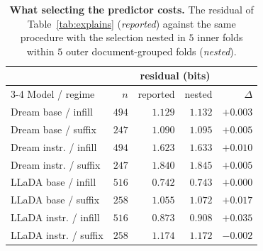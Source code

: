 \begin{table}[!ht]
\centering
\footnotesize
\setlength{\tabcolsep}{5pt}
\begin{tabular}{lrrrr}
\toprule
 & & \multicolumn{2}{c}{residual (bits)} & \\
\cmidrule(lr){3-4}
Model / regime & $n$ & reported & nested & $\Delta$ \\
\midrule
Dream base / infill & $494$ & $1.129$ & $1.132$ & $+0.003$ \\
Dream base / suffix & $247$ & $1.090$ & $1.095$ & $+0.005$ \\
Dream instr. / infill & $494$ & $1.623$ & $1.633$ & $+0.010$ \\
Dream instr. / suffix & $247$ & $1.840$ & $1.845$ & $+0.005$ \\
LLaDA base / infill & $516$ & $0.742$ & $0.743$ & $+0.000$ \\
LLaDA base / suffix & $258$ & $1.055$ & $1.072$ & $+0.017$ \\
LLaDA instr. / infill & $516$ & $0.873$ & $0.908$ & $+0.035$ \\
LLaDA instr. / suffix & $258$ & $1.174$ & $1.172$ & $-0.002$ \\
\bottomrule
\end{tabular}
\caption{\textbf{What selecting the predictor costs.} The residual of
Table~\ref{tab:explains} (\emph{reported}) against the same procedure with the selection
nested in $5$ inner folds within $5$ outer
document-grouped folds (\emph{nested}).}\label{tab:nested}
\end{table}
